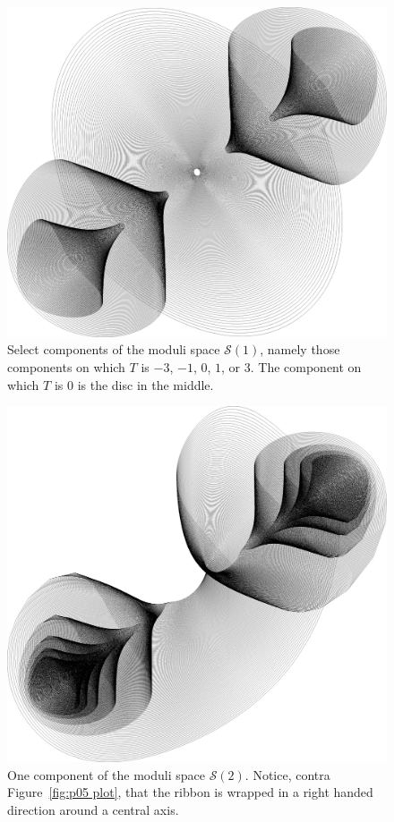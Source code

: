 \documentclass{article}
\begin{document}
\begin{figure}
    \includegraphics[width=\textwidth]{graphics/moduli_plot_p1.png}
    \caption{Select components of the moduli space $\mathcal{S}(1)$, namely those components on which $T$ is $-3$, $-1$, $0$, $1$, or $3$. The component on which $T$ is $0$ is the disc in the middle.}
    \label{fig:p1 plot}
\end{figure}

\begin{figure}
    \includegraphics[width=\textwidth]{graphics/moduli_plot_p2.png}
    \caption{One component of the moduli space $\mathcal{S}(2)$. Notice, contra Figure~\ref{fig:p05 plot}, that the ribbon is wrapped in a right handed direction around a central axis.}
    \label{fig:p2 plot}
\end{figure}
\end{document}
